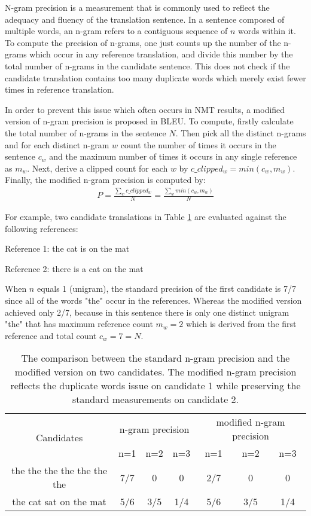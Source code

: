 N-gram precision is a measurement that is commonly used to reflect the adequacy and fluency of the translation sentence. In a sentence composed of multiple words, an n-gram refers to a contiguous sequence of $ n $ words within it. To compute the precision of n-grams, one just counts up the number of the n-grams which occur in any reference translation, and divide this number by the total number of n-grams in the candidate sentence. This does not check if the candidate translation contains too many duplicate words which merely exist fewer times in reference translation. 

In order to prevent this issue which often occurs in NMT results, a modified version of n-gram precision is proposed in BLEU. To compute, firstly calculate the total number of n-grams in the sentence $ N $. Then pick all the distinct n-grams and for each distinct n-gram $ w $ count the number of times it occurs in the sentence $ c_{w} $ and the maximum number of times it occurs in any single reference as $ m_{w} $. Next, derive a clipped count for each $ w $ by $ c\_clipped_{w} = min(c_{w},m_{w}) $. Finally, the modified n-gram precision is computed by:
\begin{align*}
P = \frac{\sum_{w}c\_clipped_{w}}{N} = \frac{\sum_{w}min(c_{w},m_{w})}{N}
\end{align*}

For example, two candidate translations in Table \ref{table:modified n-gram} are evaluated against the following references:

Reference 1: the cat is on the mat

Reference 2: there is a cat on the mat

When $ n $ equals 1 (unigram), the standard precision of the first candidate is 7/7 since all of the words "the" occur in the references. Whereas the modified version achieved only 2/7, because in this sentence there is only one distinct unigram "the" that has maximum reference count $ m_{w} = 2 $ which is derived from the first reference and total count $ c_{w} = 7 = N $.

\begin{table}[h]
\centering
\caption{The comparison between the standard n-gram precision and the modified version on two candidates. The modified n-gram precision reflects the duplicate words issue on candidate 1 while preserving the standard measurements on candidate 2.}
\label{table:modified n-gram}
\begin{tabular}{c|ccc|ccc}
\multirow{2}{*}{ Candidates } & \multicolumn{3}{c|}{ n-gram precision } & \multicolumn{3}{c}{ modified n-gram precision } \\
\cline{2-7}
& n=1 & n=2 & n=3 & n=1 & n=2 & n=3 \\
\hline
the the the the the the the & 7/7 & 0 & 0 & 2/7 & 0 & 0 \\
\hline
the cat sat on the mat & 5/6 & 3/5 & 1/4 & 5/6 & 3/5 & 1/4 \\
\end{tabular}
\end{table}

